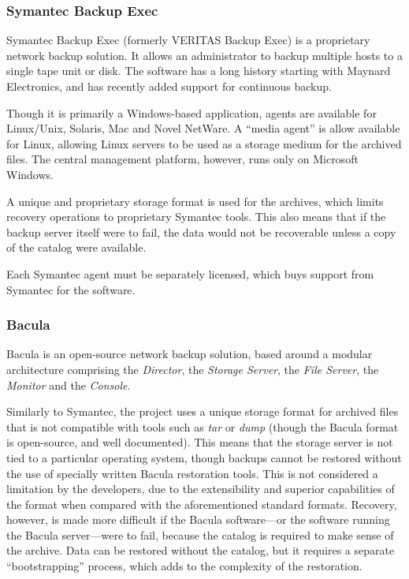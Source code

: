 \subsubsection{Symantec Backup Exec}

Symantec Backup Exec (formerly VERITAS Backup Exec) is a proprietary network
backup solution. It allows an administrator to backup multiple hosts to
a single tape unit or disk. The software has a long history starting with
Maynard Electronics\cite{Symantec-history}, and has recently added support for
continuous backup\cite{Symantec-about}.

Though it is primarily a Windows-based application, agents are available for
Linux/Unix, Solaris, Mac and Novel NetWare. A ``media agent'' is allow
available for Linux, allowing Linux servers to be used as a storage medium for
the archived files. The central management platform, however, runs only on
Microsoft Windows\cite{Symantec-about}.

A unique and proprietary storage format is used for the archives, which limits
recovery operations to proprietary Symantec tools. This also means that if the
backup server itself were to fail, the data would not be recoverable unless
a copy of the catalog were available.

Each Symantec agent must be separately licensed, which buys support from
Symantec for the software\cite{Symantec-about}.

\subsubsection{Bacula}

Bacula is an open-source network backup solution, based around a modular
architecture comprising the \emph{Director}, the \emph{Storage Server}, the
\emph{File Server}, the \emph{Monitor} and the
\emph{Console}\cite{Bacula-about}.

Similarly to Symantec, the project uses a unique storage format for archived
files that is not compatible with tools such as \emph{tar} or \emph{dump}
(though the Bacula format is open-source, and well documented). This means that
the storage server is not tied to a particular operating system, though backups
cannot be restored without the use of specially written Bacula restoration
tools. This is not considered a limitation by the developers, due to the
extensibility and superior capabilities of the format when compared with the
aforementioned standard formats\cite{Bacula-about}. Recovery, however, is made
more difficult if the Bacula software---or the software running the Bacula
server---were to fail, because the catalog is required to make sense of the
archive. Data can be restored without the catalog, but it requires a separate
``bootstrapping'' process, which adds to the complexity of the restoration.

